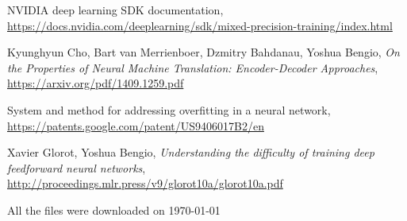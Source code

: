 \documentclass[licencjacka,en]{pracamgr}
\newcommand{\bibDownloadDate}{\today}
\begin{document}
\begin{thebibliography}{99}
		NVIDIA deep learning SDK documentation, 
		\href{https://docs.nvidia.com/deeplearning/sdk/mixed-precision-training/index.html}{https://docs.nvidia.com/deeplearning/sdk/mixed-precision-training/index.html}
		
		 Kyunghyun Cho, Bart van Merrienboer, Dzmitry Bahdanau, Yoshua Bengio, \textit{On the Properties of Neural Machine Translation: Encoder-Decoder Approaches},  \href{https://arxiv.org/pdf/1409.1259.pdf}{https://arxiv.org/pdf/1409.1259.pdf}
		
		 System and method for addressing overfitting in a neural network,  \href{https://patents.google.com/patent/US9406017B2/en}{https://patents.google.com/patent/US9406017B2/en}
		
		 Xavier Glorot, Yoshua Bengio, \textit{Understanding the difficulty of training deep feedforward neural networks},  \href{http://proceedings.mlr.press/v9/glorot10a/glorot10a.pdf}{http://proceedings.mlr.press/v9/glorot10a/glorot10a.pdf}
		
	\end{thebibliography}
	All the files were downloaded on \bibDownloadDate
	
\end{document}
